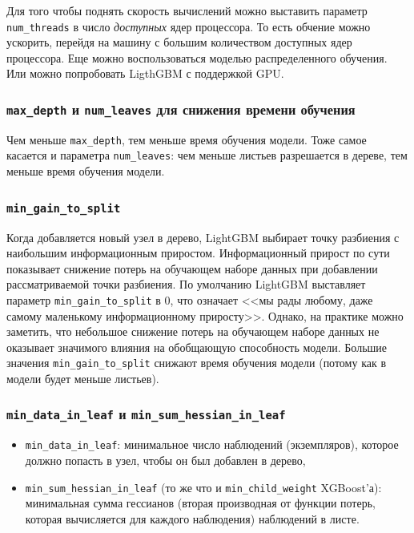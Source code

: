 \documentclass[%
	11pt,
	a4paper,
	utf8,
		]{article}
\begin{document}
Для того чтобы поднять скорость вычислений можно выставить параметр \verb|num_threads| в число \emph{доступных} ядер процессора. То есть обчение можно ускорить, перейдя на машину с большим количеством доступных ядер процессора. Еще можно воспользоваться моделью распределенного обучения. Или можно попробовать LigthGBM с поддержкой GPU.

\subsubsection{\texttt{max\_depth} и \texttt{num\_leaves} для снижения времени обучения}

Чем меньше \verb|max_depth|, тем меньше время обучения модели. Тоже самое касается и параметра \verb|num_leaves|: чем меньше листьев разрешается в дереве, тем меньше время обучения модели.

\subsubsection{\texttt{min\_gain\_to\_split}}

Когда добавляется новый узел в дерево, LightGBM выбирает точку разбиения с наибольшим информационным приростом. Информационный прирост по сути показывает снижение потерь на обучающем наборе данных при добавлении рассматриваемой точки разбиения. По умолчанию LightGBM выставляет параметр \verb|min_gain_to_split| в 0, что означает <<мы рады любому, даже самому маленькому информационному приросту>>. Однако, на практике можно заметить, что небольшое снижение потерь на обучающем наборе данных не оказывает значимого влияния на обобщающую способность модели. Большие значения \verb|min_gain_to_split| снижают время обучения модели (потому как в модели будет меньше листьев).

\subsubsection{\texttt{min\_data\_in\_leaf} и \texttt{min\_sum\_hessian\_in\_leaf}}

\begin{itemize}
	\item \verb|min_data_in_leaf|: минимальное число наблюдений (экземпляров), которое должно попасть в узел, чтобы он был добавлен в дерево,
	
	\item \verb|min_sum_hessian_in_leaf| (то же что и \verb|min_child_weight| XGBoost'а): минимальная сумма гессианов (вторая производная от функции потерь, которая вычисляется для каждого наблюдения) наблюдений в листе.
\end{itemize}
\end{document}
